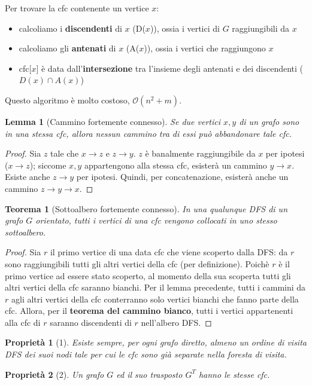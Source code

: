 \documentclass[11pt]{article}
\newtheorem*{theorem}{Teorema}
\newtheorem*{proprietà}{Proprietà}
\newtheorem*{lemma}{Lemma}
\begin{document}
Per trovare la cfc contenente un vertice $x$:
\begin{itemize}
    \item calcoliamo i \textbf{discendenti} di $x$ (D($x$)), ossia i vertici di $G$ raggiungibili da $x$
    \item calcoliamo gli \textbf{antenati} di $x$ (A($x$)), ossia i vertici che raggiungono $x$
    \item cfc[$x$] è data dall'\textbf{intersezione} tra l'insieme degli antenati e dei discendenti ($D(x)\cap A(x)$)
\end{itemize}
Questo algoritmo è molto costoso, $\mathcal{O}(n^2+m)$.
\begin{lemma}[Cammino fortemente connesso]
    Se due vertici $x,y$ di un grafo sono in una stessa cfc, allora nessun cammino tra di essi può abbandonare tale cfc.
\end{lemma}
\begin{proof}
    Sia $z$ tale che $x\rightarrow z$ e $z\rightarrow y$. $z$ è banalmente raggiungibile da $x$ per ipotesi ($x\rightarrow z$); 
    siccome $x,y$ appartengono alla stessa cfc, esisterà un cammino $y\rightarrow x$. Esiste anche $z\rightarrow y$ per 
    ipotesi. Quindi, per concatenazione, esisterà anche un cammino $z\rightarrow y\rightarrow x$.
\end{proof}
\begin{theorem}[Sottoalbero fortemente connesso]
    In una qualunque DFS di un grafo $G$ orientato, tutti i vertici di una cfc vengono collocati in uno stesso sottoalbero.
\end{theorem}
\begin{proof}
    Sia $r$ il primo vertice di una data cfc che viene scoperto dalla DFS: da $r$ sono raggiungibili tutti gli altri vertici 
    della cfc (per definizione). Poichè $r$ è il primo vertice ad essere stato scoperto, al momento della sua scoperta tutti 
    gli altri vertici della cfc saranno bianchi. Per il lemma precedente, tutti i cammini da $r$ agli altri vertici della 
    cfc conterranno solo vertici bianchi che fanno parte della cfc. Allora, per il \textbf{teorema del cammino bianco}, 
    tutti i vertici appartenenti alla cfc di $r$ saranno discendenti di $r$ nell'albero DFS.
\end{proof}
\begin{proprietà}[1]
    Esiste sempre, per ogni grafo diretto, almeno un ordine di visita DFS dei suoi nodi tale per cui le cfc sono già 
    separate nella foresta di visita.
\end{proprietà}
\begin{proprietà}[2]
    Un grafo $G$ ed il suo trasposto $G^T$ hanno le stesse cfc.
\end{proprietà}
\end{document}
